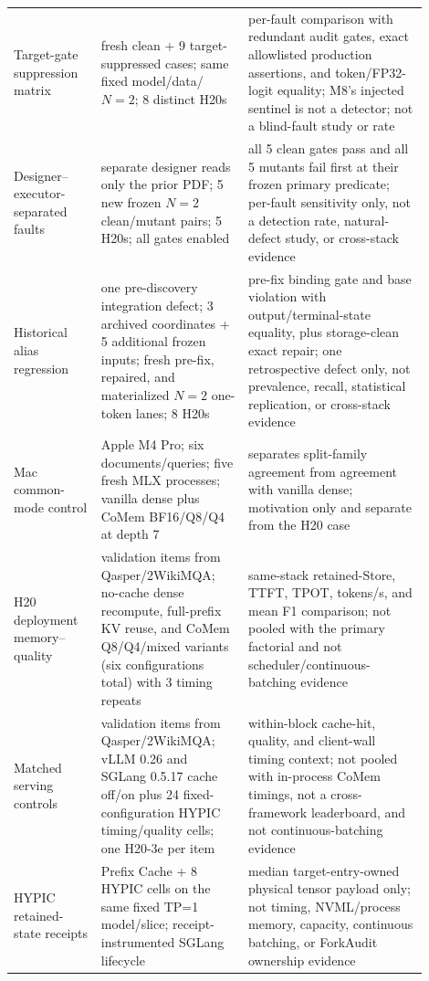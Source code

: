 \documentclass{article}
\begin{document}
\begin{longtable}{@{}>{\raggedright\arraybackslash}p{0.19\linewidth}>{\raggedright\arraybackslash}p{0.32\linewidth}>{\raggedright\arraybackslash}p{0.39\linewidth}@{}}
  Target-gate suppression matrix & 9 fresh clean + 9 target-suppressed cases; same fixed model/data/$N=2$; 8 distinct H20s & per-fault comparison with redundant audit gates, exact allowlisted production assertions, and token/FP32-logit equality; M8's injected sentinel is not a detector; not a blind-fault study or rate \\
  Designer--executor-separated faults & separate designer reads only the prior PDF; 5 new frozen $N=2$ clean/mutant pairs; 5 H20s; all gates enabled & all 5 clean gates pass and all 5 mutants fail first at their frozen primary predicate; per-fault sensitivity only, not a detection rate, natural-defect study, or cross-stack evidence \\
  Historical alias regression & one pre-discovery integration defect; 3 archived coordinates + 5 additional frozen inputs; fresh pre-fix, repaired, and materialized $N=2$ one-token lanes; 8 H20s & pre-fix binding gate and base violation with output/terminal-state equality, plus storage-clean exact repair; one retrospective defect only, not prevalence, recall, statistical replication, or cross-stack evidence \\
  Mac common-mode control & Apple M4 Pro; six documents/queries; five fresh MLX processes; vanilla dense plus CoMem BF16/Q8/Q4 at depth 7 & separates split-family agreement from agreement with vanilla dense; motivation only and separate from the H20 case \\
  H20 deployment memory--quality & 8 validation items from Qasper/2WikiMQA; no-cache dense recompute, full-prefix KV reuse, and CoMem Q8/Q4/mixed variants (six configurations total) with 3 timing repeats & same-stack retained-Store, TTFT, TPOT, tokens/s, and mean F1 comparison; not pooled with the primary factorial and not scheduler/continuous-batching evidence \\
  Matched serving controls & 8 validation items from Qasper/2WikiMQA; vLLM 0.26 and SGLang 0.5.17 cache off/on plus 24 fixed-configuration HYPIC timing/quality cells; one H20-3e per item & within-block cache-hit, quality, and client-wall timing context; not pooled with in-process CoMem timings, not a cross-framework leaderboard, and not continuous-batching evidence \\
  HYPIC retained-state receipts & 8 Prefix Cache + 8 HYPIC cells on the same fixed TP=1 model/slice; receipt-instrumented SGLang lifecycle & median target-entry-owned physical tensor payload only; not timing, NVML/process memory, capacity, continuous batching, or ForkAudit ownership evidence \\

\end{longtable}
\end{document}
